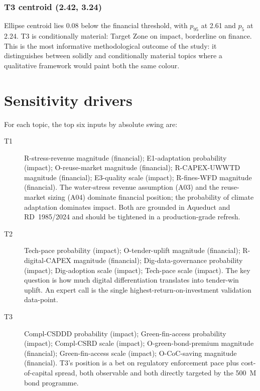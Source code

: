 \documentclass[11pt, a4paper, twoside, openright]{scrreprt}
\newcommand{\euro}{\texteuro}
\begin{document}
\subsubsection{T3 centroid (2.42, 3.24)}

Ellipse centroid lies 0.08 below the financial threshold, with $p_{95}$ at 2.61 and $p_5$ at 2.24. T3 is conditionally material: Target Zone on impact, borderline on finance. This is the most informative methodological outcome of the study: it distinguishes between solidly and conditionally material topics where a qualitative framework would paint both the same colour.

\section{Sensitivity drivers}
\label{sec:sensitivity}

For each topic, the top six inputs by absolute swing are:

\begin{description}
\item[T1] R-stress-revenue magnitude (financial); E1-adaptation probability (impact); O-reuse-market magnitude (financial); R-CAPEX-UWWTD magnitude (financial); E3-quality scale (impact); R-fines-WFD magnitude (financial). The water-stress revenue assumption (A03) and the reuse-market sizing (A04) dominate financial position; the probability of climate adaptation dominates impact. Both are grounded in Aqueduct and RD~1985/2024 and should be tightened in a production-grade refresh.

\item[T2] Tech-pace probability (impact); O-tender-uplift magnitude (financial); R-digital-CAPEX magnitude (financial); Dig-data-governance probability (impact); Dig-adoption scale (impact); Tech-pace scale (impact). The key question is how much digital differentiation translates into tender-win uplift. An expert call is the single highest-return-on-investment validation data-point.

\item[T3] Compl-CSDDD probability (impact); Green-fin-access probability (impact); Compl-CSRD scale (impact); O-green-bond-premium magnitude (financial); Green-fin-access scale (impact); O-CoC-saving magnitude (financial). T3's position is a bet on regulatory enforcement pace plus cost-of-capital spread, both observable and both directly targeted by the \euro{}500~M bond programme.
\end{description}
\end{document}
